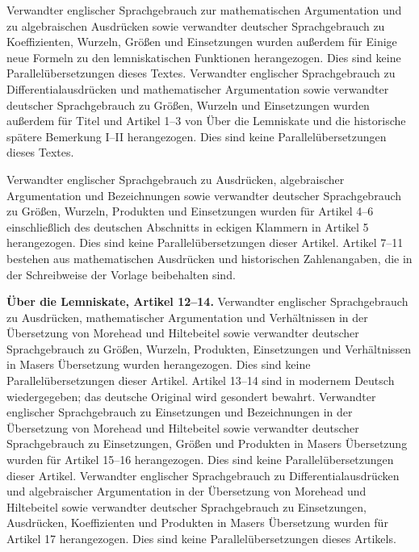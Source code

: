  Verwandter englischer Sprachgebrauch zur mathematischen Argumentation und zu algebraischen Ausdrücken sowie verwandter deutscher Sprachgebrauch zu Koeffizienten, Wurzeln, Größen und Einsetzungen wurden außerdem für Einige neue Formeln zu den lemniskatischen Funktionen herangezogen. Dies sind keine Parallelübersetzungen dieses Textes.
 Verwandter englischer Sprachgebrauch zu Differentialausdrücken und mathematischer Argumentation sowie verwandter deutscher Sprachgebrauch zu Größen, Wurzeln und Einsetzungen wurden außerdem für Titel und Artikel 1–3 von Über die Lemniskate und die historische spätere Bemerkung I–II herangezogen. Dies sind keine Parallelübersetzungen dieses Textes.
\par\endgroup\clearpage\thispagestyle{empty}\medskip
\begingroup\fontsize{9}{9.5}\selectfont\raggedright
 Verwandter englischer Sprachgebrauch zu Ausdrücken, algebraischer Argumentation und Bezeichnungen sowie verwandter deutscher Sprachgebrauch zu Größen, Wurzeln, Produkten und Einsetzungen wurden für Artikel 4–6 einschließlich des deutschen Abschnitts in eckigen Klammern in Artikel 5 herangezogen. Dies sind keine Parallelübersetzungen dieser Artikel. Artikel 7–11 bestehen aus mathematischen Ausdrücken und historischen Zahlenangaben, die in der Schreibweise der Vorlage beibehalten sind.
\par\medskip\textbf{Über die Lemniskate, Artikel 12–14.} Verwandter englischer Sprachgebrauch zu Ausdrücken, mathematischer Argumentation und Verhältnissen in der Übersetzung von Morehead und Hiltebeitel sowie verwandter deutscher Sprachgebrauch zu Größen, Wurzeln, Produkten, Einsetzungen und Verhältnissen in Masers Übersetzung wurden herangezogen. Dies sind keine Parallelübersetzungen dieser Artikel. Artikel 13–14 sind in modernem Deutsch wiedergegeben; das deutsche Original wird gesondert bewahrt. Verwandter englischer Sprachgebrauch zu Einsetzungen und Bezeichnungen in der Übersetzung von Morehead und Hiltebeitel sowie verwandter deutscher Sprachgebrauch zu Einsetzungen, Größen und Produkten in Masers Übersetzung wurden für Artikel 15–16 herangezogen. Dies sind keine Parallelübersetzungen dieser Artikel. Verwandter englischer Sprachgebrauch zu Differentialausdrücken und algebraischer Argumentation in der Übersetzung von Morehead und Hiltebeitel sowie verwandter deutscher Sprachgebrauch zu Einsetzungen, Ausdrücken, Koeffizienten und Produkten in Masers Übersetzung wurden für Artikel 17 herangezogen. Dies sind keine Parallelübersetzungen dieses Artikels.


